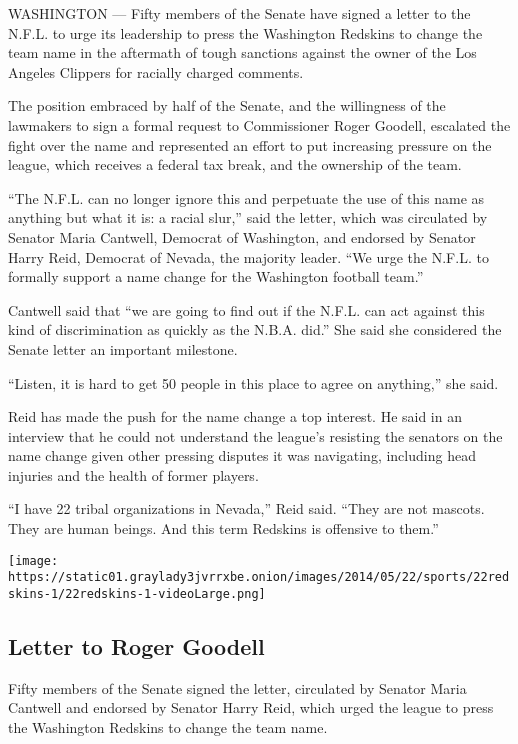 WASHINGTON --- Fifty members of the Senate have signed a letter to the
N.F.L. to urge its leadership to press the Washington Redskins to change
the team name in the aftermath of tough sanctions against the owner of
the Los Angeles Clippers for racially charged comments.

The position embraced by half of the Senate, and the willingness of the
lawmakers to sign a formal request to Commissioner Roger Goodell,
escalated the fight over the name and represented an effort to put
increasing pressure on the league, which receives a federal tax break,
and the ownership of the team.

``The N.F.L. can no longer ignore this and perpetuate the use of this
name as anything but what it is: a racial slur,'' said the letter, which
was circulated by Senator Maria Cantwell, Democrat of Washington, and
endorsed by Senator Harry Reid, Democrat of Nevada, the majority leader.
``We urge the N.F.L. to formally support a name change for the
Washington football team.''

Cantwell said that ``we are going to find out if the N.F.L. can act
against this kind of discrimination as quickly as the N.B.A. did.'' She
said she considered the Senate letter an important milestone.

``Listen, it is hard to get 50 people in this place to agree on
anything,'' she said.

Reid has made the push for the name change a top interest. He said in an
interview that he could not understand the league's resisting the
senators on the name change given other pressing disputes it was
navigating, including head injuries and the health of former players.

``I have 22 tribal organizations in Nevada,'' Reid said. ``They are not
mascots. They are human beings. And this term Redskins is offensive to
them.''

\href{https://www.nytimes3xbfgragh.onion/interactive/2014/05/22/sports/football/22redskins-letter.html}{}

\texttt{[image: https://static01.graylady3jvrrxbe.onion/images/2014/05/22/sports/22redskins-1/22redskins-1-videoLarge.png]}

\hypertarget{letter-to-roger-goodell}{%
\subsection{Letter to Roger Goodell}\label{letter-to-roger-goodell}}

Fifty members of the Senate signed the letter, circulated by Senator
Maria Cantwell and endorsed by Senator Harry Reid, which urged the
league to press the Washington Redskins to change the team name.

